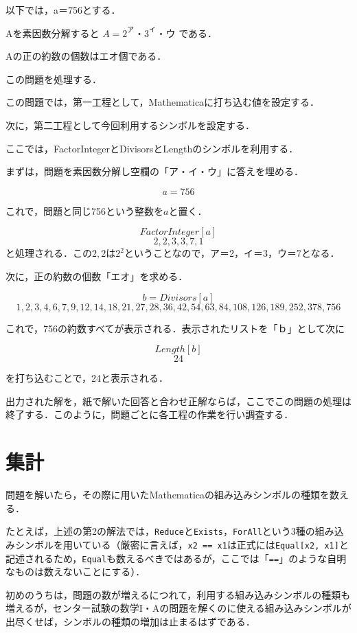 以下では，a＝756とする．

Aを素因数分解すると
$A=2^ア・3^イ・ウ$
である．

Aの正の約数の個数はエオ個である．

この問題を処理する．

この問題では，第一工程として，Mathematicaに打ち込む値を設定する．

次に，第二工程として今回利用するシンボルを設定する．

ここでは，FactorIntegerとDivisorsとLengthのシンボルを利用する．

まずは，問題を素因数分解し空欄の「ア・イ・ウ」に答えを埋める．

\[a=756\]

これで，問題と同じ756という整数を$a$と置く．

\[FactorInteger[a]\]
\[{{2,2},{3,3},{7,1}}\]
と処理される．この${2,2}$は$2^2$ということなので，ア＝2，イ＝3，ウ＝7となる．

次に，正の約数の個数「エオ」を求める．

\[b=Divisors[a]\]
\[{1,2,3,4,6,7,9,12,14,18,21,27,28,36,42,54,63,84,108,126,189,252,378,756}\]

これで，756の約数すべてが表示される．表示されたリストを「ｂ」として次に

\[Length[b]\]
\[24\]

を打ち込むことで，24と表示される．

出力された解を，紙で解いた回答と合わせ正解ならば，ここでこの問題の処理は終了する．このように，問題ごとに各工程の作業を行い調査する．

\clearpage

\section{集計}

問題を解いたら，その際に用いたMathematicaの組み込みシンボルの種類を数える．

たとえば，上述の第2の解法では，\verb|Reduce|と\verb|Exists|，\verb|ForAll|という3種の組み込みシンボルを用いている（厳密に言えば，\verb|x2 == x1|は正式には\verb|Equal[x2, x1]|と記述されるため，\verb|Equal|も数えるべきではあるが，ここでは「\verb|==|」のような自明なものは数えないことにする）．

初めのうちは，問題の数が増えるにつれて，利用する組み込みシンボルの種類も増えるが，センター試験の数学I・Aの問題を解くのに使える組み込みシンボルが出尽くせば，シンボルの種類の増加は止まるはずである．


